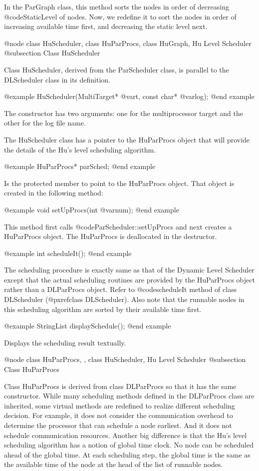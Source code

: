 In the ParGraph class, this method sorts the nodes in order of decreasing
@code{StaticLevel} of nodes. Now, we redefine it to sort the nodes in order
of increasing available time first, and decreasing the static level next.

@node class HuScheduler, class HuParProcs, class HuGraph, Hu Level Scheduler
@subsection Class HuScheduler

Class HuScheduler, derived from the ParScheduler class, is parallel to the
DLScheduler class in its definition.

@example
HuScheduler(MultiTarget* @var{t}, const char* @var{log});
@end example

The constructor has two arguments: one for the multiprocessor target and the
other for the log file name.

The HuScheduler class has a pointer to the HuParProcs object that will
provide the details of the Hu's level scheduling algorithm.

@example
HuParProcs* parSched;
@end example

Is the protected member to point to the HuParProcs object.
That object is created in the following method:

@example
void setUpProcs(int @var{num});
@end example

This method first calls @code{ParScheduler::setUpProcs} and next creates
a HuParProcs object. The HuParProcs is deallocated in the destructor.

@example
int scheduleIt();
@end example

The scheduling procedure is exactly same as that of the Dynamic Level 
Scheduler except that the actual scheduling routines are provided
by the HuParProcs object rather than a DLParProcs object. 
Refer to @code{scheduleIt} method of class DLScheduler
(@pxref{class DLScheduler}). Also note that the runnable nodes in
this scheduling algorithm are sorted by their available time first.

@example
StringList displaySchedule();
@end example

Displays the scheduling result textually.

@node class HuParProcs, , class HuScheduler, Hu Level Scheduler
@subsection Class HuParProcs

Class HuParProcs is derived from class DLParProcs so that it has the
same constructor. While many scheduling methods defined in the
DLParProcs class are inherited, some virtual methods are redefined to
realize different scheduling decision. For example, it does not
consider the communication overhead to determine the processor that can
schedule a node earliest. And it does not schedule communication resources.
Another big difference is that the Hu's level scheduling algorithm has
a notion of global time clock. No node can be scheduled ahead of the global
time. At each scheduling step, the global time is the same as the
available time of the node at the head of the list of runnable nodes.

